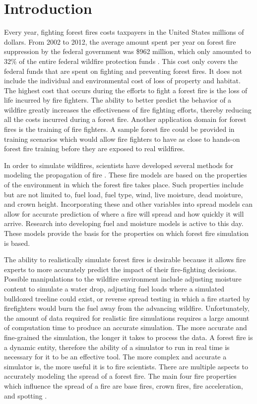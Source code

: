 \chapter{Introduction}

Every year, fighting forest fires costs taxpayers in the United States millions of dollars. From 2002 to 2012, the average amount spent per year on forest fire suppression by the federal government was \$962 million, which only amounted to 32\% of the entire federal wildfire protection funds \cite{forestcost}. This cost only covers the federal funds that are spent on fighting and preventing forest fires. It does not include the individual and environmental cost of loss of property and habitat. The highest cost that occurs during the efforts to fight a forest fire is the loss of life incurred by fire fighters. The ability to better predict the behavior of a wildfire greatly increases the effectiveness of fire fighting efforts, thereby reducing all the costs incurred during a forest fire. Another application domain for forest fires is the training of fire fighters. A sample forest fire could be provided in training scenarios which would allow fire fighters to have as close to hands-on forest fire training before they are exposed to real wildfires. 

In order to simulate wildfires, scientists have developed several methods for modeling the propagation of fire \cite{roth,BEHAVE,1983roth}. These fire models are based on the properties of the environment in which the forest fire takes place. Such properties include but are not limited to, fuel load, fuel type, wind, live moisture, dead moisture, and crown height. Incorporating these and other variables into spread models can allow for accurate prediction of where a fire will spread and how quickly it will arrive. Research into developing fuel and moisture models is active to this day. These models provide the basis for the properties on which forest fire simulation is based.

The ability to realistically simulate forest fires is desirable because it allows fire experts to more accurately predict the impact of their fire-fighting decisions. Possible manipulations to the wildfire environment include adjusting moisture content to simulate a water drop, adjusting fuel loads where a simulated bulldozed treeline could exist, or reverse spread testing in which a fire started by firefighters would burn the fuel away from the advancing wildfire. Unfortunately, the amount of data required for realistic fire simulations requires a large amount of computation time to produce an accurate simulation. The more accurate and fine-grained the simulation, the longer it takes to process the data. A forest fire is a dynamic entity, therefore the ability of a simulator to run in real time is necessary for it to be an effective tool. The more complex and accurate a simulator is, the more useful it is to fire scientists. There are multiple aspects to accurately modeling the spread of a forest fire. The main four fire properties which influence the spread of a fire are base fires, crown fires, fire acceleration, and spotting \cite{firereview}. 

